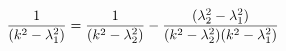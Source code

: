 \begin{equation}
\frac{1}{(k^{2}-\lambda _{1}^{2})}=\frac{1}{(k^{2}-\lambda _{2}^{2})}-\frac{%
(\lambda _{2}^{2}-\lambda _{1}^{2})}{(k^{2}-\lambda _{2}^{2})(k^{2}-\lambda
_{1}^{2})}
\end{equation}

